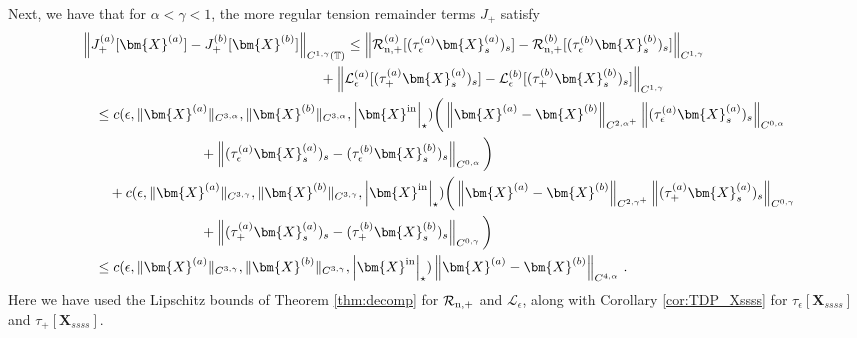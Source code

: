 \documentclass[11pt,reqno]{amsart}
\newcommand{\T}{\mathbb{T}}
\newcommand{\X}{\bm{X}}
\newcommand{\abs}[1]{\left\lvert #1 \right\rvert}
\newcommand{\norm}[1]{\left\lVert #1 \right\rVert}
\newcommand{\mc}[1]{\mathcal{#1}}
\theoremstyle{definition}
\begin{document}
Next, we have that for $\alpha<\gamma<1$, the more regular tension remainder terms $J_+$ satisfy  
\begin{equation}\label{eq:Jplus_lip}
\begin{aligned}
  &\norm{J_+^{(a)}[\X^{(a)}]-J_+^{(b)}[\X^{(b)}]}_{C^{1,\gamma}(\T)} 
  \le \norm{\mc{R}_{\rm n,+}^{(a)}[(\tau_\epsilon^{(a)}\X_s^{(a)})_s] - \mc{R}_{\rm n,+}^{(b)}[(\tau_\epsilon^{(b)}\X_s^{(b)})_s]}_{C^{1,\gamma}}\\
  &\hspace{6cm} + \norm{\mc{L}_\epsilon^{(a)}[(\tau_+^{(a)}\X_s^{(a)})_s] - \mc{L}_\epsilon^{(b)}[(\tau_+^{(b)}\X_s^{(b)})_s]}_{C^{1,\gamma}}\\
  &\quad \le c(\epsilon,\|\X^{(a)}\|_{C^{3,\alpha}},\|\X^{(b)}\|_{C^{3,\alpha}},\abs{\X^{\rm in}}_\star)\bigg(\norm{\X^{(a)}-\X^{(b)}}_{C^{2,\alpha^+}}\norm{(\tau_\epsilon^{(a)}\X_s^{(a)})_s}_{C^{0,\alpha}} \\
  &\hspace{3cm}+ \norm{(\tau_\epsilon^{(a)}\X_s^{(a)})_s-(\tau_\epsilon^{(b)}\X_s^{(b)})_s}_{C^{0,\alpha}}\bigg)\\
  &\qquad + c(\epsilon,\|\X^{(a)}\|_{C^{3,\gamma}},\|\X^{(b)}\|_{C^{3,\gamma}},\abs{\X^{\rm in}}_\star)\bigg(\norm{\X^{(a)}-\X^{(b)}}_{C^{2,\gamma^+}}\norm{(\tau_+^{(a)}\X_s^{(a)})_s}_{C^{0,\gamma}} \\
  &\hspace{3cm}+ \norm{(\tau_+^{(a)}\X_s^{(a)})_s-(\tau_+^{(b)}\X_s^{(b)})_s}_{C^{0,\gamma}}\bigg)\\
  &\quad \le c(\epsilon,\|\X^{(a)}\|_{C^{3,\gamma}},\|\X^{(b)}\|_{C^{3,\gamma}},\abs{\X^{\rm in}}_\star)\norm{\X^{(a)}-\X^{(b)}}_{C^{4,\alpha}}\,.
\end{aligned}
\end{equation}
Here we have used the Lipschitz bounds of Theorem \ref{thm:decomp} for $\mc{R}_{\rm n,+}$ and $\mc{L}_\epsilon$, along with Corollary \ref{cor:TDP_Xssss} for $\tau_\epsilon[\X_{ssss}]$ and $\tau_+[\X_{ssss}]$.
\end{document}
